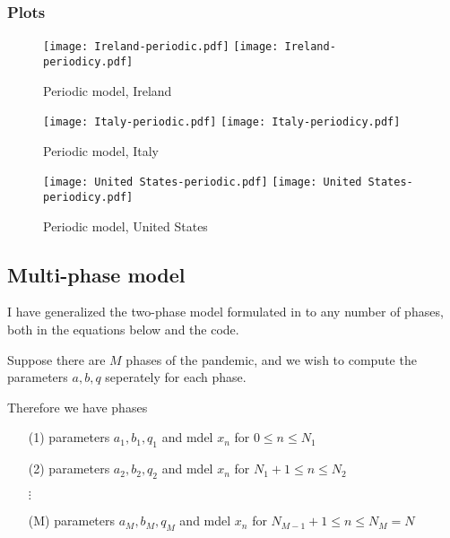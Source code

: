 \subsubsection{Plots}

\begin{figure}[H]
  \texttt{[image: Ireland-periodic.pdf]} \label{fig:ireland-periodic}
\endminipage\hfill
{}
  \texttt{[image: Ireland-periodicy.pdf]} \label{fig:ireland-periodicy}
\endminipage
\caption{Periodic model, Ireland}
\end{figure}

\begin{figure}[H]
  \texttt{[image: Italy-periodic.pdf]} \label{fig:italy-periodic}
\endminipage\hfill
{}
  \texttt{[image: Italy-periodicy.pdf]} \label{fig:italy-periodicy}
\endminipage
\caption{Periodic model, Italy}
\end{figure}

\begin{figure}[H]
  \texttt{[image: United States-periodic.pdf]} \label{fig:usa-periodic}
\endminipage\hfill
{}
  \texttt{[image: United States-periodicy.pdf]} \label{fig:usa-periodicy}
\endminipage
\caption{Periodic model, United States}
\end{figure}

\subsection{Multi-phase model}

I have generalized the two-phase model formulated in \cite{grigor20} to any number of phases, both in the equations below and the code.

Suppose there are $M$ phases of the pandemic, and we wish to compute the parameters $a,b,q$ seperately for each phase.

Therefore we have phases

\begin{itemize}
\item[(1)] parameters $a_1,b_1,q_1$ and mdel $x_n$ for $0\leq n \leq N_1$
\item[(2)]  parameters $a_2,b_2,q_2$ and mdel $x_n$ for $N_1+1\leq n \leq N_2$

$\vdots$

\item[(M)] parameters $a_M,b_M,q_M$ and mdel $x_n$ for $N_{M-1}+1\leq n \leq N_M = N$
\end{itemize}


